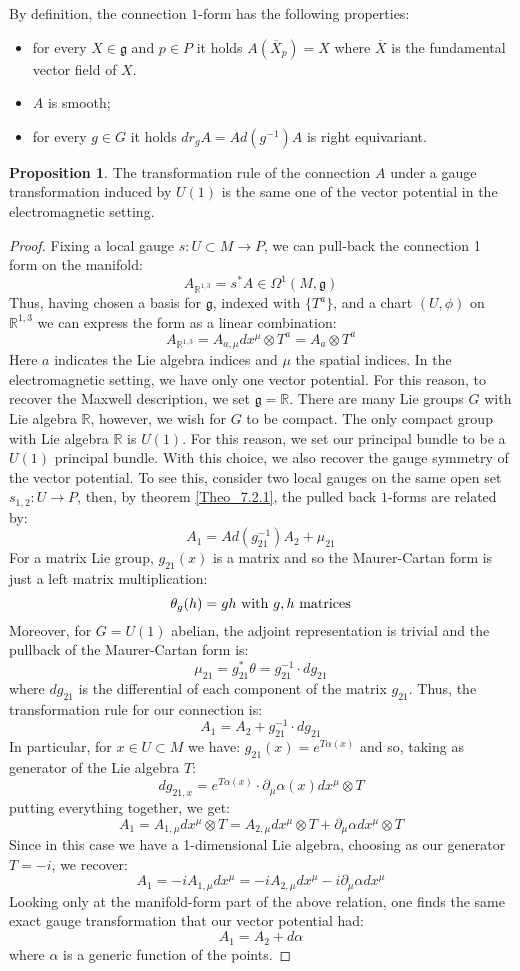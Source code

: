 \documentclass[12pt,a4paper]{report}
\theoremstyle{definition}
\theoremstyle{Theorem}
\newtheorem{Prop}[Def]{Proposition}
\theoremstyle{definition}
\theoremstyle{definition}
\begin{document}
	By definition, the connection $1$-form has the following properties:
	\begin{itemize}
		\item for every $X\in \mathfrak{g}$ and $p\in P$ it holds $A(\overline{X}_p)=X$ where $\overline{X}$ is the fundamental vector field of $X$.
		\item $A$ is smooth;
		\item for every $g\in G$ it holds $dr_gA=Ad(g^{-1})A$ is right equivariant.
	\end{itemize}
	\begin{Prop}
		The transformation rule of the connection $A$ under a gauge transformation induced by $U(1)$ is the same one of the vector potential in the electromagnetic setting.
	\end{Prop}
	\begin{proof}
		Fixing a local gauge $s:U\subset M\rightarrow P$, we can pull-back the connection 1 form on the manifold:
		$$A_{\mathbb{R}^{1,3}}=s^*A\in\Omega^1(M,\mathfrak{g})$$
		Thus, having chosen a basis for $\mathfrak{g}$, indexed with $\{T^a\}$, and a chart $(U,\phi)$ on $\mathbb{R}^{1,3}$ we can express the form as a linear combination:
		$$A_{\mathbb{R}^{1,3}}=A_{a,\mu} dx^\mu\otimes T^a=A_a\otimes T^a$$
		Here $a$ indicates the Lie algebra indices and $\mu$ the spatial indices. In the electromagnetic setting, we have only one vector potential. For this reason, to recover the Maxwell description, we set $\mathfrak{g}=\mathbb{R}$. There are many Lie groups $G$ with Lie algebra $\mathbb{R}$, however, we wish for $G$ to be compact. The only compact group with Lie algebra $\mathbb{R}$ is $U(1)$. For this reason, we set our principal bundle to be a $U(1)$ principal bundle. With this choice, we also recover the gauge symmetry of the vector potential. To see this, consider two local gauges on the same open set $s_{1,2}:U\rightarrow P$, then, by theorem \ref{Theo_7.2.1}, the pulled back $1$-forms are related by:
		$$A_1=Ad(g_{21}^{-1})A_2+\mu_{21}$$
		For a matrix Lie group, $g_{21}(x)$ is a matrix and so the Maurer-Cartan form is just a left matrix multiplication: $$\theta_g(h)=gh\hbox{ with $g,h$ matrices}$$ 
		Moreover, for $G=U(1)$ abelian, the adjoint representation is trivial and the pullback of the Maurer-Cartan form is:
		$$\mu_{21}=g_{21}^*\theta=g_{21}^{-1}\cdot dg_{21}$$ 
		where $dg_{21}$ is the differential of each component of the matrix $g_{21}$. Thus, the transformation rule for our connection is:
		$$A_1=A_2+g_{21}^{-1}\cdot dg_{21}$$
		In particular, for $x\in U\subset M$ we have: $g_{21}(x)=e^{T\alpha(x)}$ and so, taking as generator of the Lie algebra $T$:
		$$dg_{21,x}=e^{T\alpha(x)}\cdot \partial_\mu\alpha(x)dx^\mu\otimes T$$
		putting everything together, we get:
		$$A_1=A_{1,\mu}dx^\mu\otimes T=A_{2,\mu}dx^\mu\otimes T+\partial_\mu\alpha dx^\mu\otimes T$$
		Since in this case we have a 1-dimensional Lie algebra, choosing as our generator $T=-i$, we recover:
		$$A_1=-iA_{1,\mu}dx^\mu=-iA_{2,\mu}dx^\mu-i\partial_\mu\alpha dx^\mu$$
		Looking only at the manifold-form part of the above relation, one finds the same exact gauge transformation that our vector potential had:
		$$A_1=A_2+d\alpha$$
		where $\alpha$ is a generic function of the points.
	\end{proof}
\end{document}

